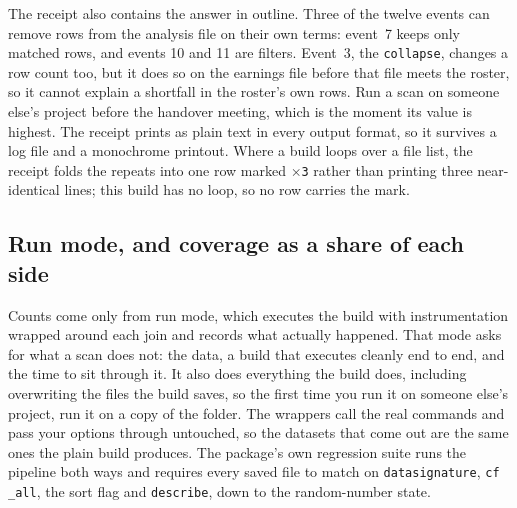 The receipt also contains the answer in outline. Three of the twelve events can remove rows from the analysis file on their own terms: event~7 keeps only matched rows, and events 10 and 11 are filters. Event~3, the \texttt{collapse}, changes a row count too, but it does so on the earnings file before that file meets the roster, so it cannot explain a shortfall in the roster's own rows. Run a scan on someone else's project before the handover meeting, which is the moment its value is highest. The receipt prints as plain text in every output format, so it survives a log file and a monochrome printout. Where a build loops over a file list, the receipt folds the repeats into one row marked \texttt{$\times$3} rather than printing three near-identical lines; this build has no loop, so no row carries the mark.

\subsection{Run mode, and coverage as a share of each side}
Counts come only from run mode, which executes the build with instrumentation wrapped around each join and records what actually happened. That mode asks for what a scan does not: the data, a build that executes cleanly end to end, and the time to sit through it. It also does everything the build does, including overwriting the files the build saves, so the first time you run it on someone else's project, run it on a copy of the folder. The wrappers call the real commands and pass your options through untouched, so the datasets that come out are the same ones the plain build produces. The package's own regression suite runs the pipeline both ways and requires every saved file to match on \texttt{datasignature}, \texttt{cf \_all}, the sort flag and \texttt{describe}, down to the random-number state.

